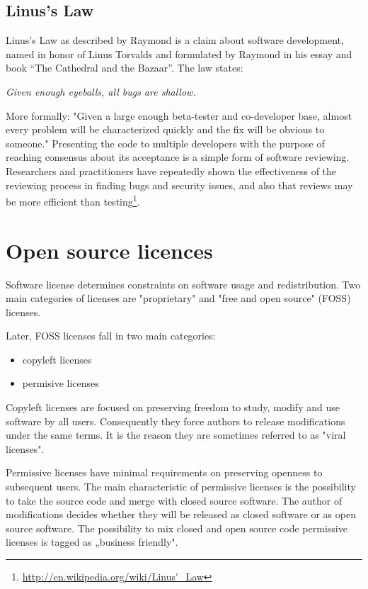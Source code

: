 \documentclass[times, utf8, seminar]{fit}
\begin{document}
\subsection{Linus's Law}

Linus's Law as described by Raymond is a claim about software development, named in honor of Linus Torvalds and formulated by Raymond in his essay and book ``The Cathedral and the Bazaar''\citep{bazaar}. The law states:

\begin{center}
\emph{\large{Given enough eyeballs, all bugs are shallow.}}
\end{center}

More formally: "Given a large enough beta-tester and co-developer base, almost every problem will be characterized quickly and the fix will be obvious to someone." Presenting the code to multiple developers with the purpose of reaching consensus about its acceptance is a simple form of software reviewing. Researchers and practitioners have repeatedly shown the effectiveness of the reviewing process in finding bugs and security issues, and also that reviews may be more efficient than testing\footnote{\url{http://en.wikipedia.org/wiki/Linus'\_Law}}.

\section{Open source licences}

Software license determines constraints on software usage and redistribution. Two main categories of licenses are "proprietary" and "free and open source" (FOSS) licenses.

Later, FOSS licenses fall in two main categories:
\begin{itemize}
  \item copyleft licenses
  \item permisive licenses 
\end{itemize} 

Copyleft licenses are focused on preserving freedom to study, modify and use software by all users. Consequently they force authors to release modifications under the same terms. It is the reason they are sometimes referred to as "viral licenses".

Permissive licenses have minimal requirements on preserving openness to subsequent users. The main characteristic of permissive licenses is the possibility to take the source code and merge with closed source software. The author of modifications decides whether they will be released as closed software or as open source software. The possibility to mix closed and open source code permissive licenses is tagged as „business friendly".
\end{document}
